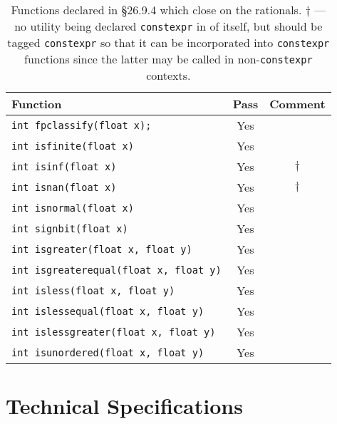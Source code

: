 \documentclass[prd,preprint,amsmath,amssymb,nofootinbib,eqsecnum]{revtex4-1}
\newcommand{\constexpr}{\code{constexpr}\xspace}
\newcommand{\code}[1]{{\tt #1}}
\begin{document}
\begin{table}[h]
	\begin{tabular}{lcc}
		Function & Pass & Comment
	\\
	\hline \hline
		\code{int fpclassify(float x);} & Yes &
	\\
	\hline
		\code{int isfinite(float x)} & Yes &
	\\
	\hline
		\code{int isinf(float x)} & Yes & $\dagger$
	\\
	\hline
		\code{int isnan(float x)} & Yes & $\dagger$ 
	\\
	\hline
		\code{int isnormal(float x)} & Yes &
	\\
	\hline
		\code{int signbit(float x)} & Yes &
	\\
	\hline
		\code{int isgreater(float x, float y)} & Yes &
	\\
	\hline
		\code{int isgreaterequal(float x, float y)} & Yes &
	\\
	\hline
		\code{int isless(float x, float y)} & Yes &
	\\
	\hline
		\code{int islessequal(float x, float y)} & Yes &
	\\
	\hline
		\code{int islessgreater(float x, float y)} & Yes &
	\\
	\hline
		\code{int isunordered(float x, float y)} & Yes &
	\end{tabular}
\caption{Functions declared in \S 26.9.4 which close on the rationals. $\dagger$ --- no utility being declared \constexpr in of itself, but should be tagged \constexpr so that it can be incorporated into \constexpr functions since the latter may be called in  non-\constexpr contexts.}
\label{tab:26.9.4}
\end{table}

\section{Technical Specifications}

\end{document}

